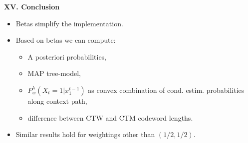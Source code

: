\documentclass[a4paper,landscape]{slides} %
\newcommand{\xtm}{x_{1}^{t-1}}
\begin{document}
\begin{slide}{\bf\Large\color{blue} XV. Conclusion}
\begin{itemize}
\item
Betas simplify the implementation.
\item
Based on betas we can compute:
\begin{itemize}
\item
A posteriori probabilities,
\item
MAP tree-model,
\item
$P_w^{\lambda}(X_t=1|\xtm)$ as convex combination of cond. estim. probabilities along context path,
\item
difference between CTW and CTM codeword lengths.
\end{itemize}
\item
Similar results hold for weightings other than $(1/2,1/2)$.
\end{itemize}


\end{slide}

\end{document}
